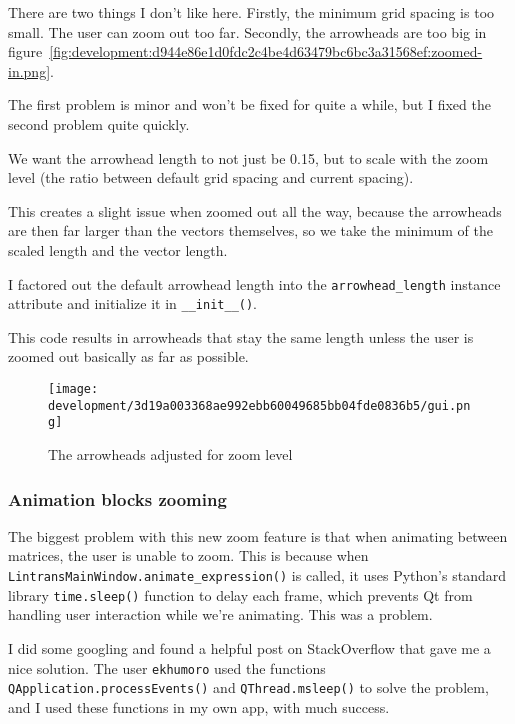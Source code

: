 \documentclass[../development.tex]{subfiles}
\begin{document}
There are two things I don't like here. Firstly, the minimum grid spacing is too small. The user can zoom out too far. Secondly, the arrowheads are too big in figure~\ref{fig:development:d944e86e1d0fdc2c4be4d63479bc6bc3a31568ef:zoomed-in.png}.

The first problem is minor and won't be fixed for quite a while, but I fixed the second problem quite quickly.

We want the arrowhead length to not just be 0.15, but to scale with the zoom level (the ratio between default grid spacing and current spacing).

This creates a slight issue when zoomed out all the way, because the arrowheads are then far larger than the vectors themselves, so we take the minimum of the scaled length and the vector length.

I factored out the default arrowhead length into the \texttt{arrowhead\_length} instance attribute and initialize it in \texttt{\_\_init\_\_()}.


This code results in arrowheads that stay the same length unless the user is zoomed out basically as far as possible.

\begin{figure}[H]
	\centering
	\texttt{[image: development/3d19a003368ae992ebb60049685bb04fde0836b5/gui.png]}
	\caption{The arrowheads adjusted for zoom level}
	\label{fig:development:3d19a003368ae992ebb60049685bb04fde0836b5:gui.png}
\end{figure}

\subsubsection{Animation blocks zooming\label{development:improving-the-gui:animation-blocks-zooming}}

The biggest problem with this new zoom feature is that when animating between matrices, the user is unable to zoom. This is because when \texttt{LintransMainWindow.animate\_expression()} is called, it uses Python's standard library \texttt{time.sleep()} function to delay each frame, which prevents Qt from handling user interaction while we're animating. This was a problem.

I did some googling and found a helpful post on StackOverflow\cite{so-update-window-in-pyqt5} that gave me a nice solution. The user \texttt{ekhumoro} used the functions \texttt{QApplication.processEvents()} and \texttt{QThread.msleep()} to solve the problem, and I used these functions in my own app, with much success.
\end{document}
